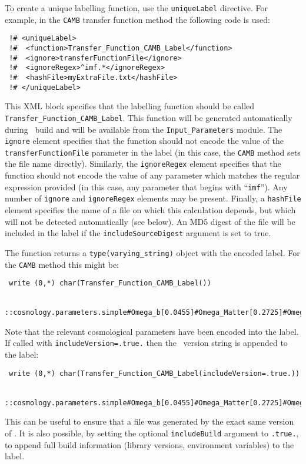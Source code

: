 To create a unique labelling function, use the {\tt uniqueLabel} directive. For example, in the {\tt CAMB} transfer function method the following code is used:
\begin{verbatim}
 !# <uniqueLabel>
 !#  <function>Transfer_Function_CAMB_Label</function>
 !#  <ignore>transferFunctionFile</ignore>
 !#  <ignoreRegex>^imf.*</ignoreRegex>
 !#  <hashFile>myExtraFile.txt</hashFile>
 !# </uniqueLabel>
\end{verbatim}
This XML block specifies that the labelling function should be called {\tt Transfer\_Function\_CAMB\_Label}. This function will be generated automatically during \glc\ build and will be available from the {\tt Input\_Parameters} module. The {\tt ignore} element specifies that the function should not encode the value of the {\tt transferFunctionFile} parameter in the label (in this case, the {\tt CAMB} method sets the file name directly). Similarly, the {\tt ignoreRegex} element specifies that the function should not encode the value of any parameter which matches the regular expression provided (in this case, any parameter that begins with ``{\tt imf}''). Any number of {\tt ignore} and {\tt ignoreRegex} elements may be present. Finally, a {\tt hashFile} element specifies the name of a file on which this calculation depends, but which will not be detected automatically (see below). An MD5 digest of the file will be included in the label if the {\tt includeSourceDigest} argument is set to true.

The function returns a {\tt type(varying\_string)} object with the encoded label. For the {\tt CAMB} method this might be:
\begin{verbatim}
 write (0,*) char(Transfer_Function_CAMB_Label())
 
 ::cosmology.parameters.simple#Omega_b[0.0455]#Omega_Matter[0.2725]#Omega_DE[0.7275]#T_CMB[2.72548]#H_0[70.2]
\end{verbatim}
Note that the relevant cosmological parameters have been encoded into the label. If called with {\tt includeVersion=.true.} then the \glc\ version string is appended to the label:
\begin{verbatim}
 write (0,*) char(Transfer_Function_CAMB_Label(includeVersion=.true.))
 
 ::cosmology.parameters.simple#Omega_b[0.0455]#Omega_Matter[0.2725]#Omega_DE[0.7275]#T_CMB[2.72548]#H_0[70.2]_v0.9.3.r2022
\end{verbatim}
This can be useful to ensure that a file was generated by the exact same version of \glc. It is also possible, by setting the optional {\tt includeBuild} argument to {\tt .true.}, to append full build information (library versions, environment variables) to the label.

